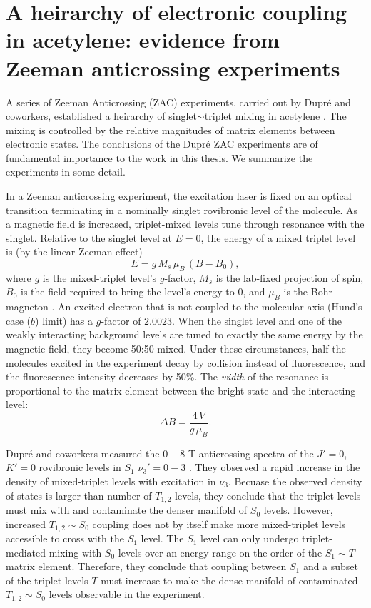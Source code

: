 \documentclass[12pt]{mitthesis}
\begin{document}
\section{A heirarchy of electronic coupling in acetylene: evidence from
  Zeeman anticrossing experiments}

A series of Zeeman Anticrossing (ZAC) experiments, carried out by
Dupr\'{e} and coworkers, established a heirarchy of
singlet$\sim$triplet mixing in acetylene \cite{dupre91, dupre93,
  dupre95a, dupre95b}.  The mixing is controlled by the relative
magnitudes of matrix elements between electronic states.  The
conclusions of the Dupr\'{e} ZAC experiments are of fundamental
importance to the work in this thesis.  We summarize the experiments
in some detail.

In a Zeeman anticrossing experiment, the excitation laser is fixed on
an optical transition terminating in a nominally singlet rovibronic
level of the molecule.  As a magnetic field is increased,
triplet-mixed levels tune through resonance with the singlet.
Relative to the singlet level at $E=0$, the energy of a mixed triplet
level is (by the linear Zeeman effect)
\begin{equation}
  E = g \, M_s \, \mu_B \, (B-B_0),
\end{equation}
where $g$ is the mixed-triplet level's $g$-factor, $M_s$ is the
lab-fixed projection of spin, $B_0$ is the field required to bring the
level's energy to 0, and $\mu_B$ is the Bohr magneton
\cite{lombardi88}.  An excited electron that is not coupled to the
molecular axis (Hund's case ($b$) limit) has a $g$-factor of $2.0023$.
When the singlet level and one of the weakly interacting background
levels are tuned to exactly the same energy by the magnetic field,
they become 50:50 mixed.  Under these circumstances, half the
molecules excited in the experiment decay by collision instead of
fluorescence, and the fluorescence intensity decreases by 50\%.  The
\emph{width} of the resonance is proportional to the matrix element
between the bright state and the interacting level:
\begin{equation}
  \Delta B = \frac{4\,V}{g\,\mu_B}.
\end{equation}

Dupr\'{e} and coworkers measured the $0-8$ T anticrossing spectra of
the $J'=0$, $K'=0$ rovibronic levels in $S_1$ $\nu_3'=0-3$
\cite{dupre91}.  They observed a rapid increase in the density of
mixed-triplet levels with excitation in $\nu_3$.  Becuase the observed
density of states is larger than number of $T_{1,2}$ levels, they
conclude that the triplet levels must mix with and contaminate the
denser manifold of $S_0$ levels.  However, increased $T_{1,2} \sim
S_0$ coupling does not by itself make more mixed-triplet levels
accessible to cross with the $S_1$ level.  The $S_1$ level can only
undergo triplet-mediated mixing with $S_0$ levels over an energy range
on the order of the $S_1 \sim T$ matrix element.  Therefore, they
conclude that coupling between $S_1$ and a subset of the triplet
levels $T$ must increase to make the dense manifold of contaminated
$T_{1,2} \sim S_0$ levels observable in the experiment.
\end{document}
